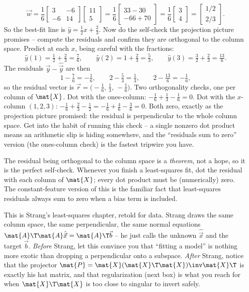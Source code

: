 \[
\vec{w}=\frac{1}{6}\begin{bmatrix} 3 & -6 \\ -6 & 14 \end{bmatrix}
\begin{bmatrix} 11 \\ 5 \end{bmatrix}
=\frac{1}{6}\begin{bmatrix} 33-30 \\ -66+70 \end{bmatrix}
=\frac{1}{6}\begin{bmatrix} 3 \\ 4 \end{bmatrix}
=\begin{bmatrix} 1/2 \\ 2/3 \end{bmatrix}.
\]
So the best-fit line is $\hat{y} = \tfrac12 x + \tfrac23$. Now do the self-check the
projection picture promises -- compute the residuals and confirm they are orthogonal to
the column space. Predict at each $x$, being careful with the fractions:
\[
\hat y(1)=\tfrac12+\tfrac23=\tfrac76,\qquad
\hat y(2)=1+\tfrac23=\tfrac53,\qquad
\hat y(3)=\tfrac32+\tfrac23=\tfrac{13}{6}.
\]
The residuals $\vec{y}-\hat{\vec{y}}$ are then
\[
1-\tfrac76=-\tfrac16,\qquad
2-\tfrac53=\tfrac13,\qquad
2-\tfrac{13}{6}=-\tfrac16,
\]
so the residual vector is $\vec{r}=\big(-\tfrac16,\,\tfrac13,\,-\tfrac16\big)$. Two
orthogonality checks, one per column of $\mat{X}$. Dot with the ones-column:
$-\tfrac16+\tfrac13-\tfrac16=0$. Dot with the $x$-column $(1,2,3)$:
$-\tfrac16+\tfrac23-\tfrac12 = -\tfrac16+\tfrac46-\tfrac36 = 0$. Both zero, exactly as the
projection picture promised: the residual is perpendicular to the whole column space. Get
into the habit of running this check -- a single nonzero dot product means an arithmetic
slip is hiding somewhere, and the ``residuals sum to zero'' version (the ones-column
check) is the fastest tripwire you have.

\begin{trapbox}
The residual being orthogonal to the column space is a \emph{theorem}, not a hope, so it
is the perfect self-check. Whenever you finish a least-squares fit, dot the residual with
each column of $\mat{X}$; every dot product must be (numerically) zero. The
constant-feature version of this is the familiar fact that least-squares residuals always
sum to zero when a bias term is included.
\end{trapbox}

\begin{strangbox}
This is Strang's least-squares chapter, retold for data. Strang draws the same column
space, the same perpendicular, the same normal equations $\mat{A}\T\mat{A}\hat{\vec{x}}
=\mat{A}\T\vec{b}$ -- he just calls the unknown $\hat{\vec{x}}$ and the target $\vec{b}$.
\emph{Before} Strang, let this convince you that ``fitting a model'' is nothing more
exotic than dropping a perpendicular onto a subspace. \emph{After} Strang, notice that
the projector $\mat{P}=\mat{X}(\mat{X}\T\mat{X})\inv\mat{X}\T$ is exactly his hat matrix,
and that regularization (next box) is what you reach for when $\mat{X}\T\mat{X}$ is too
close to singular to invert safely.
\end{strangbox}

